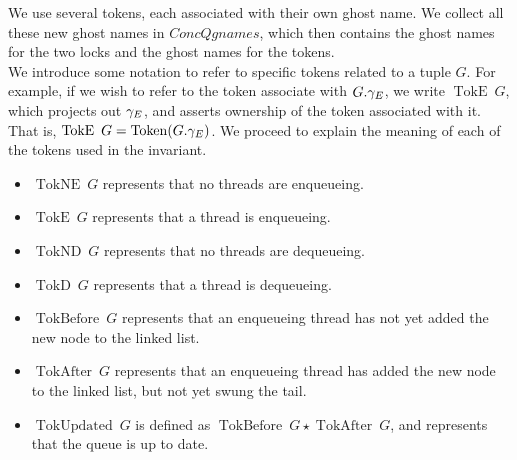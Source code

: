 \documentclass[a4paper, 10pt]{report}
\theoremstyle{definition}
\newcommand{\ConcQgnames}{ConcQgnames}
\newcommand{\Qg}{G}
\newcommand{\Token}[1]{\operatorname{Token}(#1)}
\newcommand{\TokE}[1]{\operatorname{TokE} ~ #1}
\newcommand{\TokEQg}{\TokE{\Qg}}
\newcommand{\TokNE}[1]{\operatorname{TokNE} ~ #1}
\newcommand{\TokNEQg}{\TokNE{\Qg}}
\newcommand{\TokD}[1]{\operatorname{TokD} ~ #1}
\newcommand{\TokDQg}{\TokD{\Qg}}
\newcommand{\TokND}[1]{\operatorname{TokND} ~ #1}
\newcommand{\TokNDQg}{\TokND{\Qg}}
\newcommand{\TokBefore}[1]{\operatorname{TokBefore} ~ #1}
\newcommand{\TokBeforeQg}{\TokBefore{\Qg}}
\newcommand{\TokAfter}[1]{\operatorname{TokAfter} ~ #1}
\newcommand{\TokAfterQg}{\TokAfter{\Qg}}
\newcommand{\TokUpdated}[1]{\operatorname{TokUpdated} ~ #1}
\newcommand{\TokUpdatedQg}{\TokUpdated{\Qg}}
\begin{document}
We use several tokens, each associated with their own ghost name. We collect all these new ghost names in $\ConcQgnames$, which then contains the ghost names for the two locks and the ghost names for the tokens.\\
We introduce some notation to refer to specific tokens related to a tuple $\Qg$. For example, if we wish to refer to the token associate with $\Qg.\gname_E$, we write $\TokEQg$, which projects out $\gamma_E$, and asserts ownership of the token associated with it. That is, $\TokEQg = \Token{\Qg.\gname_E}$. We proceed to explain the meaning of each of the tokens used in the invariant.
\begin{itemize}
  \item $\TokNEQg$ represents that no threads are enqueueing.
  \item $\TokEQg$ represents that a thread is enqueueing.
  \item $\TokNDQg$ represents that no threads are dequeueing.
  \item $\TokDQg$ represents that a thread is dequeueing.
  \item $\TokBeforeQg$ represents that an enqueueing thread has not yet added the new node to the linked list.
  \item $\TokAfterQg$ represents that an enqueueing thread has added the new node to the linked list, but not yet swung the tail.
  \item $\TokUpdatedQg$ is defined as $\TokBeforeQg \star{} \TokAfterQg$, and represents that the queue is up to date.
\end{itemize}
\end{document}

